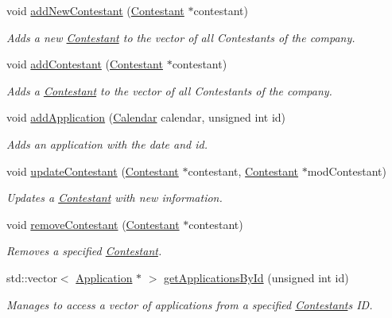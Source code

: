 \begin{DoxyCompactItemize}
void \hyperlink{class_company_a6784ebb8b31be1fcb5a1e5665b84c06c}{add\+New\+Contestant} (\hyperlink{class_contestant}{Contestant} $\ast$contestant)
\begin{DoxyCompactList}\small\item\em Adds a new \hyperlink{class_contestant}{Contestant} to the vector of all Contestants of the company. \end{DoxyCompactList}\item 
void \hyperlink{class_company_a8db12922bdf5e3bc1817dd001ca81f7a}{add\+Contestant} (\hyperlink{class_contestant}{Contestant} $\ast$contestant)
\begin{DoxyCompactList}\small\item\em Adds a \hyperlink{class_contestant}{Contestant} to the vector of all Contestants of the company. \end{DoxyCompactList}\item 
void \hyperlink{class_company_a3d0fee60dd012d0303483a142dfd4ce1}{add\+Application} (\hyperlink{class_calendar}{Calendar} calendar, unsigned int id)
\begin{DoxyCompactList}\small\item\em Adds an application with the date and id. \end{DoxyCompactList}\item 
void \hyperlink{class_company_a8948265cd00ed452e5336964ef2b5537}{update\+Contestant} (\hyperlink{class_contestant}{Contestant} $\ast$contestant, \hyperlink{class_contestant}{Contestant} $\ast$mod\+Contestant)
\begin{DoxyCompactList}\small\item\em Updates a \hyperlink{class_contestant}{Contestant} with new information. \end{DoxyCompactList}\item 
void \hyperlink{class_company_acccfc131326fef9d641bdab101d0cb9e}{remove\+Contestant} (\hyperlink{class_contestant}{Contestant} $\ast$contestant)
\begin{DoxyCompactList}\small\item\em Removes a specified \hyperlink{class_contestant}{Contestant}. \end{DoxyCompactList}\item 
std\+::vector$<$ \hyperlink{class_application}{Application} $\ast$ $>$ \hyperlink{class_company_af4cd471e2417b865078b3404e964b334}{get\+Applications\+By\+Id} (unsigned int id)
\begin{DoxyCompactList}\small\item\em Manages to access a vector of applications from a specified \hyperlink{class_contestant}{Contestant}\textquotesingle{}s ID. \end{DoxyCompactList}\item 

\end{DoxyCompactItemize}
